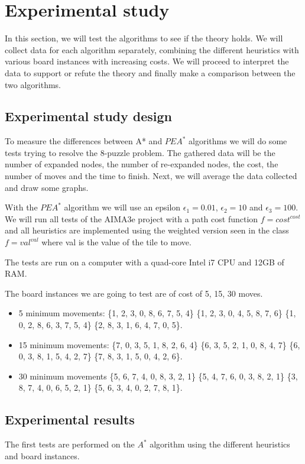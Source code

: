\documentclass[runningheads]{llncs}
\begin{document}
\section{Experimental study}
In this section, we will test the algorithms to see if the theory holds.
We will collect data for each algorithm separately, combining the different
heuristics with various board instances with increasing costs. We will proceed to
interpret the data to support or refute the theory and finally make a comparison between the two algorithms.
\subsection{Experimental study design}
To measure the differences between A* and \(PEA^*\) algorithms we will do some tests trying to resolve the  8-puzzle problem.
The gathered data  will be the number of expanded nodes, the number of re-expanded nodes, the cost, the number of moves and the time to finish. Next, we will average the data collected and draw some graphs.

With the \(PEA^*\) algorithm we will use an epsilon $\epsilon_1=0.01$, $\epsilon_2=10$ and $\epsilon_3=100$.
We will run all tests of the AIMA3e project with a path cost function $f={cost}^{cost}$ and 
all heuristics are implemented using the weighted version seen in the class $f={val}^{val}$ 
where val is the value of the tile to move.

The tests are run on a computer with a quad-core Intel i7 CPU and 12GB of RAM.

The board instances we are going to test are of cost of 5, 15, 30 moves.

\begin{itemize}
    \item 5 minimum movements: 
        \{1, 2, 3, 0, 8, 6, 7, 5, 4\}
        \{1, 2, 3, 0, 4, 5, 8, 7, 6\}
        \{1, 0, 2, 8, 6, 3, 7, 5, 4\}
        \{2, 8, 3, 1, 6, 4, 7, 0, 5\}.

    \item 15 minimum movements: 
        \{7, 0, 3, 5, 1, 8, 2, 6, 4\}
        \{6, 3, 5, 2, 1, 0, 8, 4, 7\}
        \{6, 0, 3, 8, 1, 5, 4, 2, 7\}
        \{7, 8, 3, 1, 5, 0, 4, 2, 6\}.

\item 30 minimum movements
        \{5, 6, 7, 4, 0, 8, 3, 2, 1\}
        \{5, 4, 7, 6, 0, 3, 8, 2, 1\} 
        \{3, 8, 7, 4, 0, 6, 5, 2, 1\}
        \{5, 6, 3, 4, 0, 2, 7, 8, 1\}.
\end{itemize}
\subsection{Experimental results}
The first tests are performed on the \(A^*\) algorithm using the different heuristics and board instances.
\end{document}
